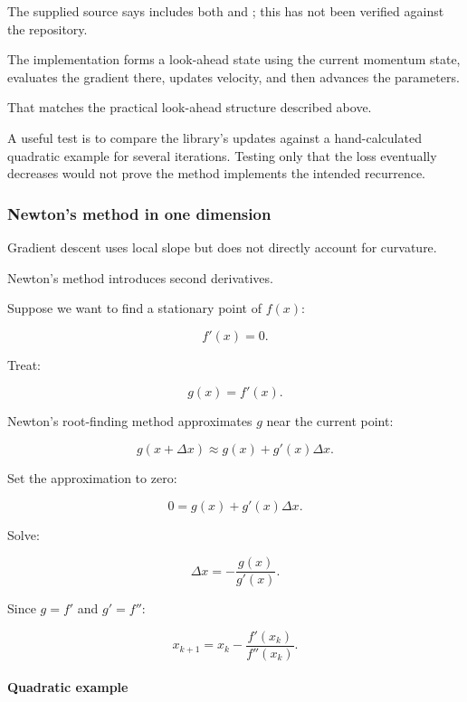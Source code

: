 \hypertarget{02-foundations-ii-ch026-repository-connection}{}

The supplied source says  includes both  and ; this has not been verified against the repository.

The  implementation forms a look-ahead state using the current momentum state, evaluates the gradient there, updates velocity, and then advances the parameters.

That matches the practical look-ahead structure described above.

A useful test is to compare the library's updates against a hand-calculated quadratic example for several iterations. Testing only that the loss eventually decreases would not prove the method implements the intended recurrence.

\subsubsection{Newton's method in one dimension}\label{02-foundations-ii-ch026-newtons-method-in-one-dimension}

\hypertarget{02-foundations-ii-ch026-newtons-method-in-one-dimension}{}

Gradient descent uses local slope but does not directly account for curvature.

Newton's method introduces second derivatives.

Suppose we want to find a stationary point of \(f(x)\):

\[
f'(x)=0.
\]

Treat:

\[
g(x)=f'(x).
\]

Newton's root-finding method approximates \(g\) near the current point:

\[
g(x+\Delta x) \approx g(x)+g'(x)\Delta x.
\]

Set the approximation to zero:

\[
0=g(x)+g'(x)\Delta x.
\]

Solve:

\[
\Delta x=-\frac{g(x)}{g'(x)}.
\]

Since \(g=f'\) and \(g'=f''\):

\[
\boxed{ x_{k+1} = x_k-\frac{f'(x_k)}{f''(x_k)} }.
\]

\paragraph{Quadratic example}\label{02-foundations-ii-ch026-quadratic-example}

